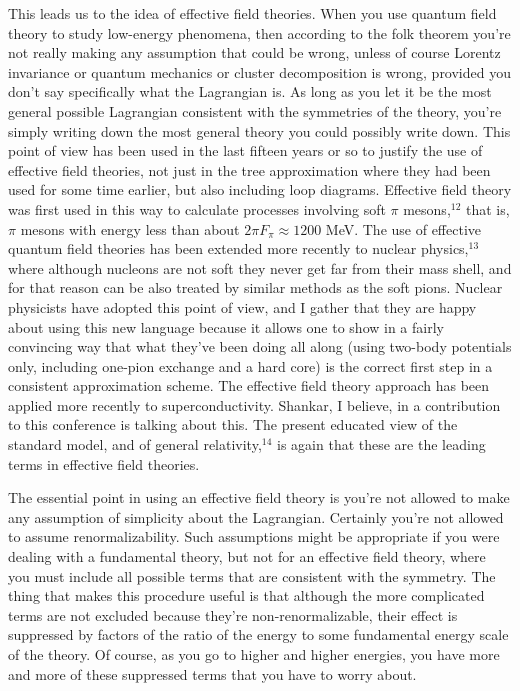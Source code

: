 This leads us to the idea of effective field theories.  When
you use  quantum field theory to study low-energy phenomena,
then according to the folk theorem you're not really making
any assumption that could be wrong, unless of course Lorentz
invariance or quantum mechanics or cluster decomposition is
wrong, provided you don't say specifically what the
Lagrangian is. As long as you let it be the most general
possible Lagrangian consistent with the symmetries of the
theory, you're simply writing down the most general theory
you could possibly write down.  This point of view has been
used in the last fifteen years or so to justify the use of
effective field theories, not just  in the tree
approximation where they had been used for some time
earlier, but also including loop diagrams.  Effective field
theory was first used in this way to calculate processes
involving soft $\pi$ mesons,$^{12}$ that is, $\pi$ mesons
with energy less
than about $2\pi F_\pi\approx 1200$ MeV.  The use of
effective quantum field theories has been extended more
recently to nuclear physics,$^{13}$  where although nucleons
are
not soft they never get far from their mass shell, and for
that reason can be also treated by similar methods as the
soft pions.  Nuclear physicists have adopted this point of
view, and I gather that they are happy about using this new
language because it allows one to show in a fairly
convincing way that what they've been doing all along (using
two-body potentials only, including one-pion exchange and a
hard core) is the correct first step in a consistent
approximation scheme.      The effective field theory
approach has been applied more recently to
superconductivity. Shankar, I believe, in a contribution to
this conference is talking about this.  The present educated
view of the standard model, and of general
relativity,$^{14}$ is
again that these are the leading terms in effective field
theories.

The essential point in using  an effective field theory is
you're not allowed to make any assumption of simplicity
about the Lagrangian.  Certainly you're not allowed to
assume renormalizability.  Such assumptions might be
appropriate if you were dealing with a fundamental theory,
but not for an effective field theory, where you must
include all possible terms that are consistent with the
symmetry.  The thing that makes this procedure useful is
that although the more complicated terms are not excluded
because they're non-renormalizable, their effect is
suppressed by factors of the ratio of the energy to some
fundamental energy scale of the theory.   Of course,  as you
go to higher and higher energies, you have more and more of
these suppressed terms that you have to worry about.

